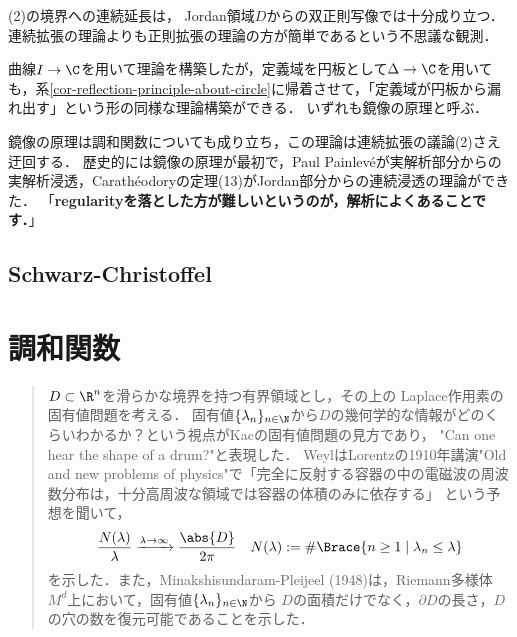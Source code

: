 \documentclass[uplatex, dvipdfmx]{jsreport}
\begin{document}
\begin{remark}
    (2)の境界への連続延長は，
    Jordan領域$D$からの双正則写像では十分成り立つ．
    連続拡張の理論よりも正則拡張の理論の方が簡単であるという不思議な観測．

    曲線$I\to\C$を用いて理論を構築したが，定義域を円板として$\Delta\to\C$を用いても，系\ref{cor-reflection-principle-about-circle}に帰着させて，「定義域が円板から漏れ出す」という形の同様な理論構築ができる．
    いずれも鏡像の原理と呼ぶ．
    
    鏡像の原理は調和関数についても成り立ち，この理論は連続拡張の議論(2)さえ迂回する．
    歴史的には鏡像の原理が最初で，Paul Painlevéが実解析部分からの実解析浸透，Carathéodoryの定理(13)がJordan部分からの連続浸透の理論ができた．
    「\textbf{regularityを落とした方が難しいというのが，解析によくあることです．}」
\end{remark}

\section{Schwarz-Christoffel}

\begin{tcolorbox}[colframe=ForestGreen, colback=ForestGreen!10!white,breakable,colbacktitle=ForestGreen!40!white,coltitle=black,fonttitle=\bfseries\sffamily,
title=上半平面から単体ポリゴンの内部上への共形変換]
    
\end{tcolorbox}

\begin{example}\label{exp-rectangle-and-Jacobi-sn-function}
    
\end{example}

\chapter{調和関数}

\begin{quotation}
    $D\subset\R^n$を滑らかな境界を持つ有界領域とし，その上の
    Laplace作用素の固有値問題を考える．
    固有値$\{\lambda_n\}_{n\in\N}$から$D$の幾何学的な情報がどのくらいわかるか？という視点がKacの固有値問題の見方であり，
    "Can one hear the shape of a drum?"と表現した．
    WeylはLorentzの1910年講演"Old and new problems of physics"で「完全に反射する容器の中の電磁波の周波数分布は，十分高周波な領域では容器の体積のみに依存する」
    という予想を聞いて，
    \[\frac{N(\lambda)}{\lambda}\xrightarrow{\lambda\to\infty}\frac{\abs{D}}{2\pi}\quad N(\lambda):=\#\Brace{n\ge1\mid\lambda_n\le\lambda}\]
    を示した．また，Minakshisundaram-Pleijeel (1948)は，Riemann多様体$M^d$上において，固有値$\{\lambda_n\}_{n\in\N}$から
    $D$の面積だけでなく，$\partial D$の長さ，$D$の穴の数を復元可能であることを示した．
\end{quotation}
\end{document}

